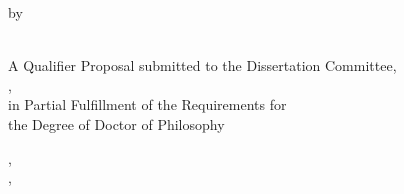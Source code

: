 
{


\begin{singlespacing}
\begin{center}
\MakeUppercase{\thesistitle}
\end{center}
\end{singlespacing}


\begin{singlespacing}
\vspace*{8\baselineskip}
\end{singlespacing}

\begin{doublespacing}
\begin{center}
by\\
\name\\
\end{center}
\end{doublespacing}

\begin{singlespacing}
\vspace*{8\baselineskip}
\end{singlespacing}

\begin{singlespacing}
\begin{center}
A Qualifier Proposal submitted to
the Dissertation Committee, \\
\university, \\
in Partial Fulfillment of the
Requirements for \\
the Degree of Doctor of Philosophy\\
\end{center}
\end{singlespacing}

\begin{singlespacing}
\vspace*{8\baselineskip}
\end{singlespacing}

\begin{doublespacing}
\begin{center}
\city, \state\\
\submissionmonth, \submissionyear\\
\end{center}
\end{doublespacing}


}
